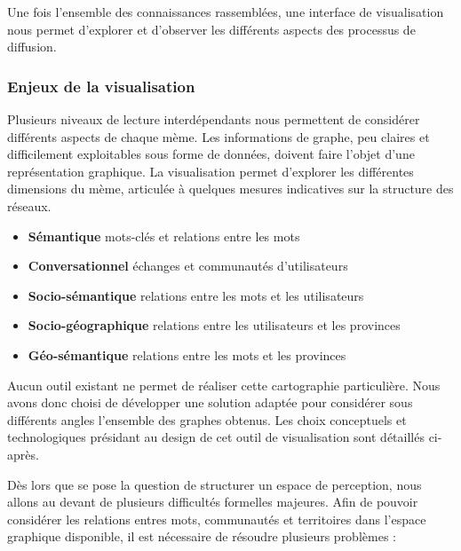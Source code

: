 Une fois l'ensemble des connaissances rassemblées, une interface de visualisation nous permet d'explorer et d'observer les différents aspects des processus de diffusion.

\subsubsection{Enjeux de la visualisation} %
\label{ssub:enjeux_de_la_visualisation}

Plusieurs niveaux de lecture interdépendants nous permettent de considérer différents aspects de chaque mème. Les informations de graphe, peu claires et difficilement exploitables sous forme de données, doivent faire l'objet d'une représentation graphique. La visualisation permet d{\textquoteright}explorer les différentes dimensions du mème, articulée à quelques mesures indicatives sur la structure des réseaux.

\begin{itemize}
    \item \textbf{Sémantique} mots-clés et relations entre les mots
    \item \textbf{Conversationnel} échanges et communautés d{\textquoteright}utilisateurs 
    \item \textbf{Socio-sémantique} relations entre les mots et les utilisateurs
    \item \textbf{Socio-géographique} relations entre les utilisateurs et les provinces
    \item \textbf{Géo-sémantique} relations entre les mots et les provinces
\end{itemize}


Aucun outil existant ne permet de réaliser cette cartographie particulière. Nous avons donc choisi de développer une solution adaptée pour considérer sous différents angles l{\textquoteright}ensemble des graphes obtenus. Les choix conceptuels et technologiques présidant au design de cet outil de visualisation sont détaillés ci-après. 

Dès lors que se pose la question de structurer un espace de perception, nous allons au devant de plusieurs difficultés formelles majeures. Afin de pouvoir considérer les relations entres mots, communautés et territoires dans l{\textquoteright}espace graphique disponible, il est nécessaire de résoudre plusieurs problèmes :

